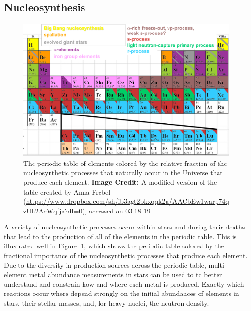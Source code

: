 \subsection{Nucleosynthesis} \label{intro:sec:nucleosynthesis}

\begin{figure}
  \centering
  \includegraphics[width=0.75\linewidth]{./figures/intro/periodic_table}
  \caption{The periodic table of elements colored by the relative fraction of the nucleosynthetic processes that naturally occur in the Universe that produce each element. \textbf{Image Credit:} A modified version of the table created by Anna Frebel (\url{https://www.dropbox.com/sh/ib3agt2bkxqqk2u/AACbEw1warp74qzUh2AcWqfja?dl=0}), accessed on 03-18-19.}
  \label{intro:fig:periodic table}
\end{figure}

A variety of nucleosynthetic processes occur within stars and during their deaths that lead to the production of all of the elements in the periodic table. This is illustrated well in Figure~\ref{intro:fig:periodic table}, which shows the periodic table colored by the fractional importance of the nucleosynthetic processes that produce each element. Due to the diversity in production sources across the periodic table, multi-element metal abundance measurements in stars can be used to to better understand and constrain how and where each metal is produced. Exactly which reactions occur where depend strongly on the initial abundances of elements in stars, their stellar masses, and, for heavy nuclei, the neutron density.

